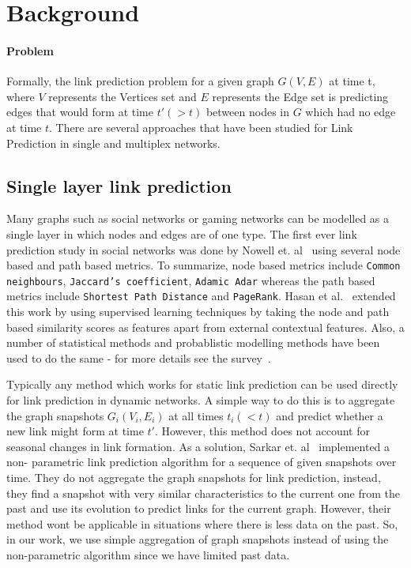 \section{Background}
\label{sec:background}


\paragraph{Problem} Formally, the link prediction problem for a given graph $G(V,
E)$ at time t, where $V$ represents the Vertices set and $E$ represents the
Edge set is predicting edges that would form at time $t' (> t)$ between nodes
in $G$ which had no edge at time $t$.  There are several approaches that have
been studied for Link Prediction in single and multiplex networks.


\subsection{Single layer link prediction}
\label{sec:slp}

Many graphs such as social networks or gaming networks can be modelled as a
single layer in which  nodes and edges are of one type. The first ever link
prediction study in social networks was done by Nowell et.
al~\cite{liben2007link} using several  node based and path based metrics. To
summarize, node based metrics include \texttt{Common neighbours},
\texttt{Jaccard's coefficient}, \texttt{Adamic Adar} whereas the path based
metrics include \texttt{Shortest Path Distance} and \texttt{PageRank}. Hasan
et al.~\cite{al2006link} extended this work  by using supervised learning
techniques by taking the node and path based similarity scores as features
apart from  external contextual features. Also, a number of statistical methods 
and probablistic modelling methods have been used to do the same - for more 
details see the survey~\cite{al2011survey}. 

Typically any method which works for static link prediction can be used
directly for link prediction in dynamic networks. A simple way to do this is to
aggregate the graph snapshots $G_i(V_i, E_i)$ at all  times $t_i(< t)$ and
predict whether a new link might form at time $t'$. However,  this method
does not account for seasonal changes in link formation. As a solution,  Sarkar
et. al~\cite{sarkar2012nonparametric} implemented a non- parametric link
prediction  algorithm for a sequence of given snapshots over time. They do not
aggregate the graph snapshots for  link prediction, instead, they find a
snapshot with very similar characteristics to the current one from the past
and use its evolution to predict links for the current graph. However, their
method wont be applicable in situations where there is less data on the past.
So, in our work, we use simple aggregation of graph snapshots instead of using the
non-parametric algorithm since we have limited past data.

